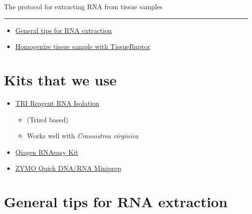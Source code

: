\documentclass[
  letterpaper,
  DIV=11,
  numbers=noendperiod]{scrreprt}
\begin{document}
The protocol for extracting RNA from tissue samples

\begin{center}\rule{0.5\linewidth}{0.5pt}\end{center}

\begin{itemize}
\item
  \href{https://drk-lo.github.io/lotterhoslabprotocols/molecprot_rnaextraction/\#general-tips-for-rna-extraction}{General
  tips for RNA extraction}
\item
  \href{https://drk-lo.github.io/lotterhoslabprotocols/molecprot_rnaextraction/\#homogenize-tissue-sample-with-tissueruptor}{Homogenize
  tissue sample with TissueRuptor}
\end{itemize}

\hypertarget{kits-that-we-use}{%
\section*{\texorpdfstring{\textbf{Kits that we
use}}{Kits that we use}}\label{kits-that-we-use}}


\begin{itemize}
\item
  \href{https://drk-lo.github.io/lotterhoslabprotocols/molecprot_rnaextraction/\#protocol-for-tri-reagent-rna-isolation}{TRI
  Reagent RNA Isolation}

  \begin{itemize}
  \item
    (Trizol based)
  \item
    Works well with \emph{Crassostrea virginica}
  \end{itemize}
\item
  \href{https://drk-lo.github.io/lotterhoslabprotocols/molecprot_rnaextraction/\#protocol-with-qiagen-rnaeasy-kit}{Qiagen
  RNAeasy Kit}
\item
  \href{https://drk-lo.github.io/lotterhoslabprotocols/molecprot_rnaextraction/\#protocol-for-zymo-quick-dna-rna-miniprep-and-tissueruptor-homogenization}{ZYMO
  Quick DNA/RNA Miniprep}
\end{itemize}

\hypertarget{general-tips-for-rna-extraction}{%
\section*{\texorpdfstring{\textbf{General tips for RNA
extraction}}{General tips for RNA extraction}}\label{general-tips-for-rna-extraction}}
\end{document}
